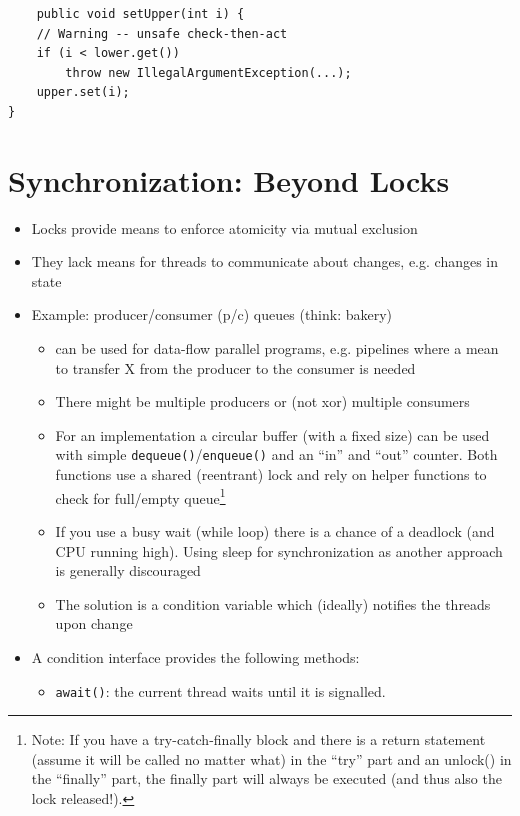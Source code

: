 \documentclass[a4paper]{article}
\newcommand{\inline}[1]{\lstinline!#1!}%
\begin{document}
\begin{itemize}
\begin{itemize}
\begin{itemize}
\begin{lstlisting}
	public void setUpper(int i) {
	// Warning -- unsafe check-then-act
	if (i < lower.get())
		throw new IllegalArgumentException(...);
	upper.set(i);
}
						\end{lstlisting}
					\end{itemize}
			\end{itemize} 
	\end{itemize}


\section{Synchronization: Beyond Locks}
\begin{itemize}
\item Locks provide means to enforce atomicity via mutual exclusion 
\item They lack means for threads to communicate about changes, e.g. changes in state
\item Example: producer/consumer (p/c) queues (think: bakery)
\begin{itemize}
\item can be used for data-flow parallel programs, e.g. pipelines where a mean to transfer X from the producer to the consumer is needed
\item There might be multiple producers or (not xor) multiple consumers
\item For an implementation a circular buffer (with a fixed size) can be used with simple \inline{dequeue()}/\inline{enqueue()} and an “in” and “out” counter. Both functions use a shared (reentrant) lock and rely on helper functions to check for full/empty queue\footnote{Note: If you have a try-catch-finally block and there is a return statement (assume it will be called no matter what) in the ``try'' part and an unlock() in the ``finally'' part, the finally part will always be executed (and thus also the lock released!).}
\item If you use a busy wait (while loop) there is a chance of a deadlock (and CPU running high). Using sleep for synchronization as another approach is generally discouraged
\item The solution is a condition variable which (ideally) notifies the threads upon change
\end{itemize}
\item A condition interface provides the following methods:
\begin{itemize}
\item \inline{await()}: the current thread waits until it is signalled. 

\end{itemize}
\end{itemize}
\end{document}

